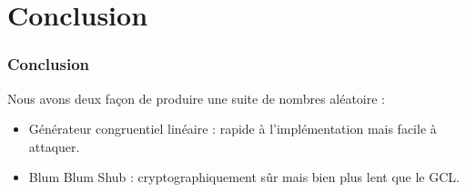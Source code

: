 \documentclass[utf8,10pt,french]{beamer}
\begin{document}
\begin{frame}

\end{frame}

\section{Conclusion}
\begin{frame}
  \frametitle{Conclusion}
Nous avons deux façon de produire une suite de nombres aléatoire :\pause
\begin{itemize}
\item Générateur congruentiel linéaire : rapide à l'implémentation mais facile à attaquer.\pause
\item Blum Blum Shub : cryptographiquement sûr mais bien plus lent que le GCL.
\end{itemize}
\end{frame}
\end{document}
